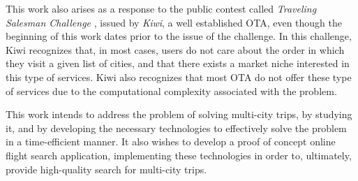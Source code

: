 This work also arises as a response to the public contest called \textit{Traveling Salesman Challenge} \cite{tsc_kiwi},
issued by \textit{Kiwi}, a well established OTA, even though the beginning of this work dates prior to the issue of the challenge.
In this challenge, Kiwi recognizes that, in most cases, users do not care about the order in which they visit 
a given list of cities, and that there exists a market niche interested in this type of services.
Kiwi also recognizes that most OTA do not offer these type of services due to the computational 
complexity associated with the problem.

This work intends to address the problem of solving multi-city trips, by studying it, and by developing 
the necessary technologies to effectively solve the problem in a time-efficient manner.
It also wishes to develop a proof of concept online flight search application, 
implementing these technologies in order to, ultimately, provide high-quality search
for multi-city trips.

